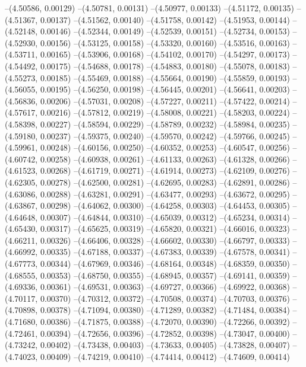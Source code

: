 --(4.50586, 0.00129)
--(4.50781, 0.00131)
--(4.50977, 0.00133)
--(4.51172, 0.00135)
--(4.51367, 0.00137)
--(4.51562, 0.00140)
--(4.51758, 0.00142)
--(4.51953, 0.00144)
--(4.52148, 0.00146)
--(4.52344, 0.00149)
--(4.52539, 0.00151)
--(4.52734, 0.00153)
--(4.52930, 0.00156)
--(4.53125, 0.00158)
--(4.53320, 0.00160)
--(4.53516, 0.00163)
--(4.53711, 0.00165)
--(4.53906, 0.00168)
--(4.54102, 0.00170)
--(4.54297, 0.00173)
--(4.54492, 0.00175)
--(4.54688, 0.00178)
--(4.54883, 0.00180)
--(4.55078, 0.00183)
--(4.55273, 0.00185)
--(4.55469, 0.00188)
--(4.55664, 0.00190)
--(4.55859, 0.00193)
--(4.56055, 0.00195)
--(4.56250, 0.00198)
--(4.56445, 0.00201)
--(4.56641, 0.00203)
--(4.56836, 0.00206)
--(4.57031, 0.00208)
--(4.57227, 0.00211)
--(4.57422, 0.00214)
--(4.57617, 0.00216)
--(4.57812, 0.00219)
--(4.58008, 0.00221)
--(4.58203, 0.00224)
--(4.58398, 0.00227)
--(4.58594, 0.00229)
--(4.58789, 0.00232)
--(4.58984, 0.00235)
--(4.59180, 0.00237)
--(4.59375, 0.00240)
--(4.59570, 0.00242)
--(4.59766, 0.00245)
--(4.59961, 0.00248)
--(4.60156, 0.00250)
--(4.60352, 0.00253)
--(4.60547, 0.00256)
--(4.60742, 0.00258)
--(4.60938, 0.00261)
--(4.61133, 0.00263)
--(4.61328, 0.00266)
--(4.61523, 0.00268)
--(4.61719, 0.00271)
--(4.61914, 0.00273)
--(4.62109, 0.00276)
--(4.62305, 0.00278)
--(4.62500, 0.00281)
--(4.62695, 0.00283)
--(4.62891, 0.00286)
--(4.63086, 0.00288)
--(4.63281, 0.00291)
--(4.63477, 0.00293)
--(4.63672, 0.00295)
--(4.63867, 0.00298)
--(4.64062, 0.00300)
--(4.64258, 0.00303)
--(4.64453, 0.00305)
--(4.64648, 0.00307)
--(4.64844, 0.00310)
--(4.65039, 0.00312)
--(4.65234, 0.00314)
--(4.65430, 0.00317)
--(4.65625, 0.00319)
--(4.65820, 0.00321)
--(4.66016, 0.00323)
--(4.66211, 0.00326)
--(4.66406, 0.00328)
--(4.66602, 0.00330)
--(4.66797, 0.00333)
--(4.66992, 0.00335)
--(4.67188, 0.00337)
--(4.67383, 0.00339)
--(4.67578, 0.00341)
--(4.67773, 0.00344)
--(4.67969, 0.00346)
--(4.68164, 0.00348)
--(4.68359, 0.00350)
--(4.68555, 0.00353)
--(4.68750, 0.00355)
--(4.68945, 0.00357)
--(4.69141, 0.00359)
--(4.69336, 0.00361)
--(4.69531, 0.00363)
--(4.69727, 0.00366)
--(4.69922, 0.00368)
--(4.70117, 0.00370)
--(4.70312, 0.00372)
--(4.70508, 0.00374)
--(4.70703, 0.00376)
--(4.70898, 0.00378)
--(4.71094, 0.00380)
--(4.71289, 0.00382)
--(4.71484, 0.00384)
--(4.71680, 0.00386)
--(4.71875, 0.00388)
--(4.72070, 0.00390)
--(4.72266, 0.00392)
--(4.72461, 0.00394)
--(4.72656, 0.00396)
--(4.72852, 0.00398)
--(4.73047, 0.00400)
--(4.73242, 0.00402)
--(4.73438, 0.00403)
--(4.73633, 0.00405)
--(4.73828, 0.00407)
--(4.74023, 0.00409)
--(4.74219, 0.00410)
--(4.74414, 0.00412)
--(4.74609, 0.00414)
